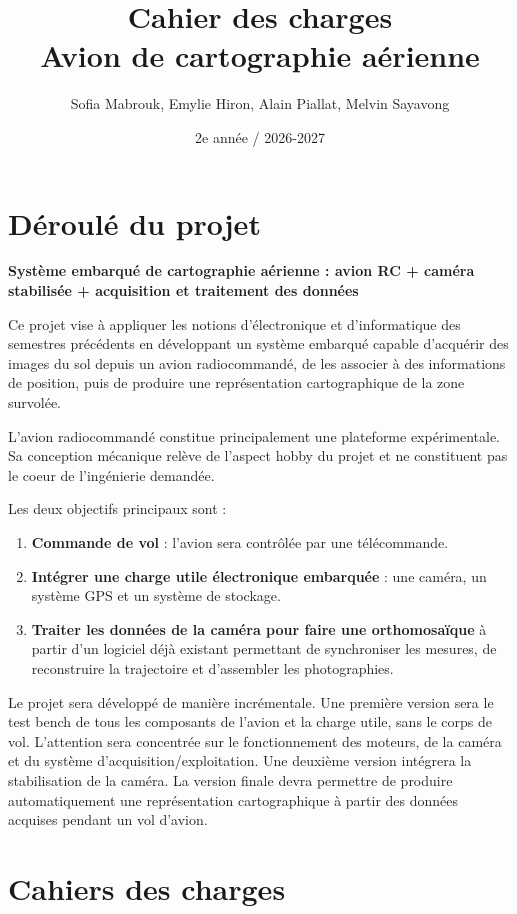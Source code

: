 \documentclass[11pt,a4paper]{article}
\title{Cahier des charges\\
Avion de cartographie aérienne}
\author{Sofia Mabrouk, Emylie Hiron, Alain Piallat, Melvin Sayavong}
\date{2e année / 2026-2027}
\begin{document}
\maketitle
\tableofcontents
\newpage

\section{Déroulé du projet}

\textbf{Système embarqué de cartographie aérienne : avion RC + caméra stabilisée + acquisition et traitement des données}

Ce projet vise à appliquer les notions d'électronique et d'informatique des semestres précédents en développant 
un système embarqué capable d'acquérir des images du sol depuis un avion radiocommandé, de les associer à des 
informations de position, puis de produire une représentation cartographique de la zone survolée.

L'avion radiocommandé constitue principalement une plateforme expérimentale. Sa conception mécanique relève de 
l'aspect hobby du projet et ne constituent pas le coeur de l'ingénierie demandée.

Les deux objectifs principaux sont :

\begin{enumerate}
    \item \textbf{Commande de vol} : l'avion sera contrôlée par une télécommande.
    \item \textbf{Intégrer une charge utile électronique embarquée} : une caméra, un système GPS et un système de stockage.

    \item \textbf{Traiter les données de la caméra pour faire une orthomosaïque} à partir d'un logiciel déjà existant permettant de synchroniser les mesures, de reconstruire la trajectoire et d'assembler les photographies.
\end{enumerate}

Le projet sera développé de manière incrémentale. Une première version sera le test bench de tous les composants de 
l'avion et la charge utile, sans le corps de vol. L'attention sera concentrée sur le fonctionnement des moteurs, de 
la caméra et du système d'acquisition/exploitation. 
Une deuxième version intégrera la stabilisation de la caméra. La version finale devra permettre de produire automatiquement une représentation cartographique à partir des données acquises pendant un vol d'avion.

\section{Cahiers des charges}
\end{document}
